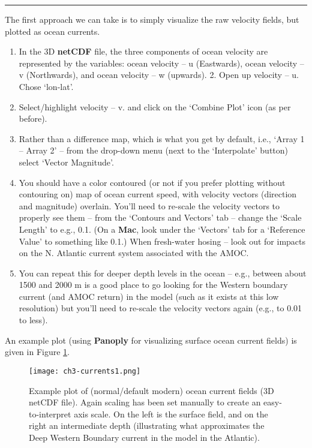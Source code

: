 \vspace{1mm}
\noindent\rule{4cm}{0.5pt}
\vspace{2mm}

\noindent The first approach we can take is to simply visualize the raw velocity fields, but plotted as ocean currents.\vspace{1mm}
\begin{enumerate}[noitemsep]
\vspace{1mm}
\item  In the 3D \textbf{netCDF} file, the three components of ocean velocity are represented by the variables: ocean velocity – u (Eastwards), ocean velocity – v (Northwards), and ocean velocity – w (upwards). 2. Open up velocity – u. Chose ‘lon-lat’.
\vspace{1mm}
\item Select/highlight velocity – v. and click on the ‘Combine Plot’ icon (as per before).
\vspace{1mm}
\item Rather than a difference map, which is what you get by default, i.e., ‘Array 1 – Array 2’ – from the drop-down menu (next to the ‘Interpolate’ button) select ‘Vector Magnitude’.
\vspace{1mm}
\item You should have a color contoured (or not if you prefer plotting without contouring on) map of ocean current speed, with velocity vectors (direction and magnitude) overlain. You’ll need to re-scale the velocity vectors to properly see them – from the ‘Contours and Vectors’ tab – change the ‘Scale Length’ to e.g., 0.1. (On a \textbf{Mac}, look under the ‘Vectors’ tab for a ‘Reference Value’ to something like 0.1.)  When fresh-water hosing – look out for impacts on the N. Atlantic current system associated with the AMOC.
\vspace{1mm}
\item You can repeat this for deeper depth levels in the ocean – e.g., between about 1500 and 2000 m is a good place to go looking for the Western boundary current (and AMOC return) in the model (such as it exists at this low resolution) but you’ll need to re-scale the velocity vectors again (e.g., to 0.01 to less).
\end{enumerate}
\vspace{1mm}

\noindent An example plot (using \textbf{Panoply} for visualizing surface ocean current fields) is given in Figure \ref{fig:ch3-currents1}.

\begin{figure}
\texttt{[image: ch3-currents1.png]}\centering
\vspace{-0mm}
\caption{Example plot of (normal/default modern) ocean current fields (3D netCDF file). Again scaling has been set manually to create an easy-to-interpret axis scale. On the left is the surface field, and on the right an intermediate depth (illustrating what approximates the Deep Western Boundary current in the model in the Atlantic).}
\label{fig:ch3-currents1}
\end{figure}

